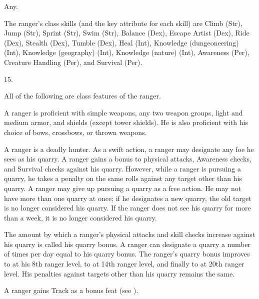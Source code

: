  Any.

The ranger's class skills (and the key attribute for each skill) are Climb (Str), Jump (Str), Sprint (Str), Swim (Str), Balance (Dex), Escape Artist (Dex), Ride (Dex), Stealth (Dex), Tumble (Dex), Heal (Int), Knowledge (dungeoneering) (Int), Knowledge (geography) (Int), Knowledge (nature) (Int), Awareness (Per), Creature Handling (Per), and Survival (Per).

15.


All of the following are class features of the ranger.

 A ranger is proficient with simple weapons, any two weapon groups, light and medium armor, and shields (except tower shields).
He is also proficient with his choice of bows, crossbows, or thrown weapons.

A ranger is a deadly hunter.
As a swift action, a ranger may designate any foe he sees as his quarry.
A ranger gains a  bonus to physical attacks, Awareness checks, and Survival checks against his quarry.
However, while a ranger is pursuing a quarry, he takes a  penalty on the same rolls against any target other than his quarry.
A ranger may give up pursuing a quarry as a free action.
He may not have more than one quarry at once; if he designates a new quarry, the old target is no longer considered his quarry.
If the ranger does not see his quarry for more than a week, it is no longer considered his quarry.

\par The amount by which a ranger's physical attacks and skill checks increase against his quarry is called his quarry bonus.
A ranger can designate a quarry a number of times per day equal to his quarry bonus.
The ranger's quarry bonus improves to  at his 8th ranger level, to  at 14th ranger level, and finally to  at 20th ranger level.
His penalties against targets other than his quarry remains the same.

A ranger gains Track as a bonus feat (see ).

